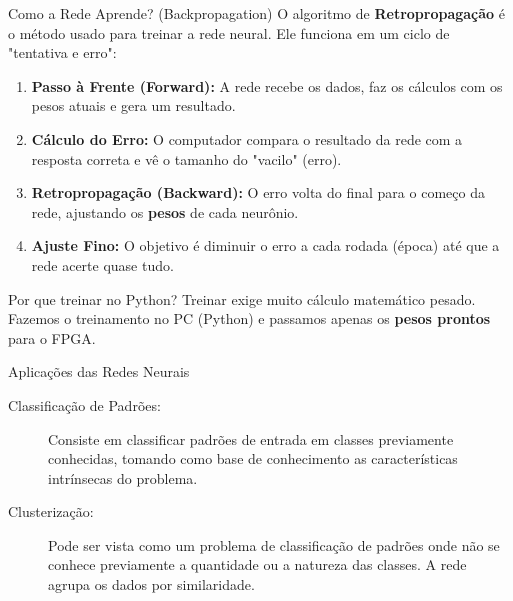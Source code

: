 \documentclass[aspectratio=169]{beamer}
\begin{document}
\begin{frame}{Como a Rede Aprende? (Backpropagation)}
	O algoritmo de \textbf{Retropropagação} é o método usado para treinar a rede neural. Ele funciona em um ciclo de "tentativa e erro":
	
	\begin{enumerate}
		\item \textbf{Passo à Frente (Forward):} A rede recebe os dados, faz os cálculos com os pesos atuais e gera um resultado.
		\item \textbf{Cálculo do Erro:} O computador compara o resultado da rede com a resposta correta e vê o tamanho do "vacilo" (erro).
		\item \textbf{Retropropagação (Backward):} O erro volta do final para o começo da rede, ajustando os \textbf{pesos} de cada neurônio.
		\item \textbf{Ajuste Fino:} O objetivo é diminuir o erro a cada rodada (época) até que a rede acerte quase tudo.
	\end{enumerate}
	
	\begin{block}{Por que treinar no Python?}
		Treinar exige muito cálculo matemático pesado. Fazemos o treinamento no PC (Python) e passamos apenas os \textbf{pesos prontos} para o FPGA.
	\end{block}
\end{frame}



\begin{frame}{Aplicações das Redes Neurais }
	\justifying
	
	\begin{description}
		\item[Classificação de Padrões:] Consiste em classificar padrões de entrada em classes previamente conhecidas, tomando como base de conhecimento as características intrínsecas do problema.
		
		\vspace{0.5cm}
		
		\item[Clusterização:] Pode ser vista como um problema de classificação de padrões onde não se conhece previamente a quantidade ou a natureza das classes. A rede agrupa os dados por similaridade.
	\end{description}
\end{frame}
\end{document}
